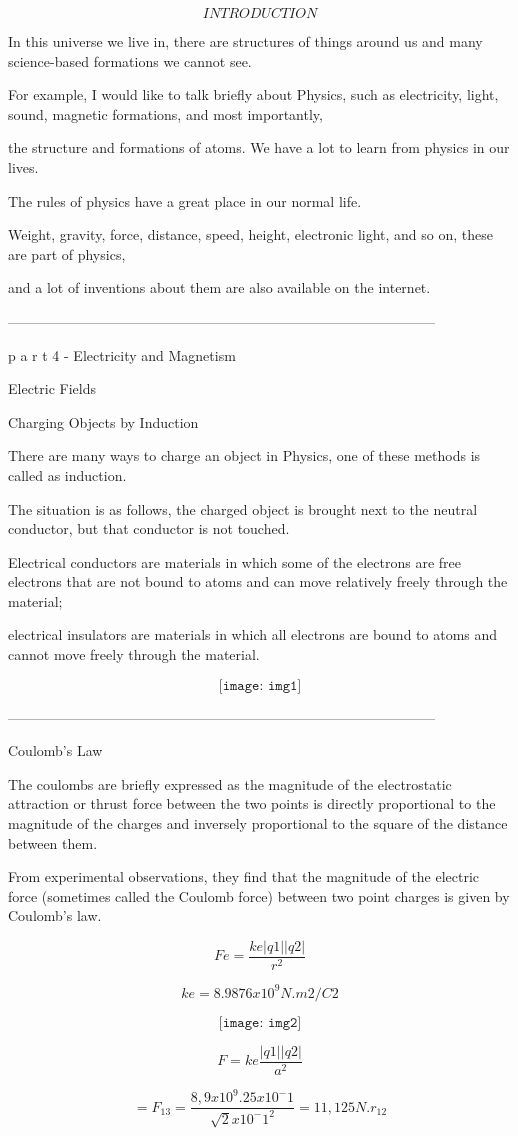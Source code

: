 \documentclass[11pt] {article}
\begin{document}
\vspace{25mm} %

							$$INTRODUCTION$$

In this universe we live in, there are structures of things around us and many science-based formations we cannot see.

For example, I would like to talk briefly about Physics, such as electricity, light, sound, magnetic formations, and most importantly, 

the structure and formations of atoms. We have a lot to learn from physics in our lives.

The rules of physics have a great place in our normal life. 

Weight, gravity, force, distance, speed, height, electronic light, and so on, these are part of physics, 

and a lot of inventions about them are also available on the internet.

\vspace{30mm} %
--------------------------------------------------------------------------------------------

p a r t 4 - Electricity and Magnetism

Electric Fields
\begin{center}
Charging Objects by Induction
\end{center}
There are many ways to charge an object in Physics, one of these methods is called as induction.

The situation is as follows, the charged object is brought next to the neutral conductor, but that conductor is not touched.

Electrical conductors are materials in which some of the electrons are free electrons that are not bound to atoms and can move relatively freely through the material; 

electrical insulators are materials in which all electrons are bound to atoms and cannot move freely through the material.

$$\texttt{[image: img1]}$$

--------------------------------------------------------------------------------------------

Coulomb’s Law
\begin{center}
The coulombs are briefly expressed as the magnitude of the electrostatic attraction or thrust force between the two points is directly proportional to the magnitude of the charges and inversely proportional to the square of the distance between them.

From experimental observations, they find that the magnitude of the electric force (sometimes called the Coulomb force) between two point charges is given by Coulomb’s law.

$$Fe = \frac{ke |q1||q2|} {r^2}$$

$$ke =  8.987 6 x 10^9 N .  m2/C2$$

$$\texttt{[image: img2]}$$

$$F = ke \frac {|q1||q2|} {a^2}$$

$$= F_13 = \frac{8,9 x 10^9 . 25 x 10^-1} {\sqrt{2}x 10^-1^2} = 11,125N . r_12$$
\end{center}
\end{document}
